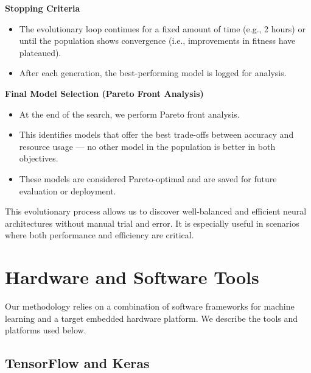  \textbf{Stopping Criteria}
  
  
  \begin{itemize}
      \item The evolutionary loop continues for a fixed amount of time (e.g., 2 hours) or until the population shows convergence (i.e., improvements in fitness have plateaued).
      \item After each generation, the best-performing model is logged for analysis.
  \end{itemize}

\textbf{Final Model Selection (Pareto Front Analysis)}
\begin{itemize}
    \item At the end of the search, we perform Pareto front analysis.
    \item This identifies models that offer the best trade-offs between accuracy and resource usage — no other model in the population is better in both objectives.
    \item These models are considered Pareto-optimal and are saved for future evaluation or deployment.


\end{itemize}

This evolutionary process allows us to discover well-balanced and efficient neural architectures without manual trial and error. It is especially useful in scenarios where both performance and efficiency are critical.





















\section{Hardware and Software Tools}

Our methodology relies on a combination of software frameworks for machine learning and a target embedded hardware platform. We describe the tools and platforms used below.

\subsection*{TensorFlow and Keras}

